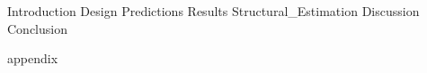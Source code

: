 \documentclass[a4paper, 10pt]{article}
\begin{document}




\clearpage

{Introduction}
{Design}
{Predictions}
{Results}
{Structural_Estimation}
{Discussion}
{Conclusion}

\begin{appendices}
	\label{sec:appendix}
 	\FloatBarrier
	{appendix}
 	\newpage
\end{appendices}

\newpage
 

\begin{refcontext}[sorting=nyt]  %
\printbibliography[heading=bibintoc]
\end{refcontext}
\end{document}
